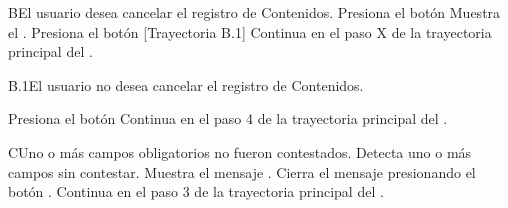 \begin{UCtrayectoriaA}{B}{El usuario desea cancelar el registro de Contenidos.}
    \UCpaso[\UCactor] Presiona el botón 
    \UCpaso Muestra el .
    \UCpaso[\UCactor] Presiona el botón  [Trayectoria B.1]
    \UCpaso Continua en el paso X de la trayectoria principal del .

\end{UCtrayectoriaA}

\begin{UCtrayectoriaA}{B.1}{El usuario no desea cancelar el registro de Contenidos.}

    \UCpaso[\UCactor] Presiona el botón 
    \UCpaso Continua en el paso 4 de la trayectoria principal del .

\end{UCtrayectoriaA}


\begin{UCtrayectoriaA}{C}{Uno o más campos obligatorios no fueron contestados.}
  \UCpaso Detecta uno o más campos sin contestar.
    \UCpaso Muestra el mensaje .
    \UCpaso[\UCactor] Cierra el mensaje presionando el botón .
    \UCpaso Continua en el paso 3 de la trayectoria principal del .
\end{UCtrayectoriaA}
